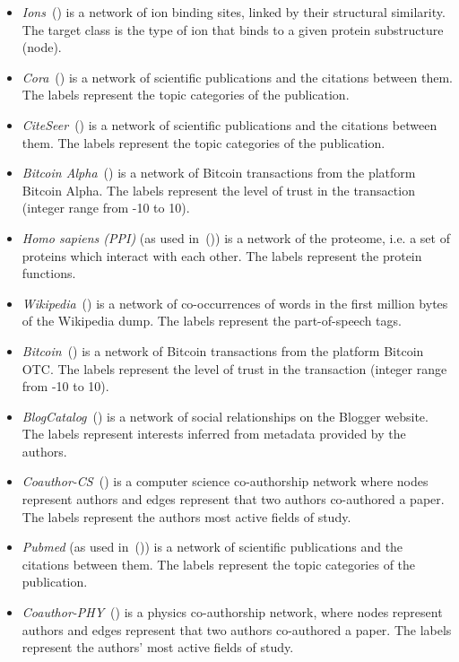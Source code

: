 \documentclass[twoside,11pt]{article}
\begin{document}
\begin{itemize}
\item \emph{Ions}~(\cite{skrlj2019deep,minfskrlj}) is a network of ion binding sites, linked by their structural similarity. The target class is the type of ion that binds to a given protein substructure (node).
\item \emph{Cora}~(\cite{Qing2003citeseer}) is a network of scientific publications and the citations between them. The labels represent the topic categories of the publication.
\item \emph{CiteSeer}~(\cite{Qing2003citeseer}) is a network of scientific publications and the citations between them. The labels represent the topic categories of the publication.
\item \emph{Bitcoin Alpha}~(\cite{skrlj2019deep}) is a network of Bitcoin transactions from the platform Bitcoin Alpha. The labels represent the level of trust in the transaction (integer range from -10 to 10).
\item \emph{Homo sapiens (PPI)} (as used in~(\cite{grover2016node2vec})) is a network of the proteome, i.e. a set of proteins which interact with each other. The labels represent the protein functions.
\item \emph{Wikipedia}~(\cite{mahoney2011large}) is a network of co-occurrences of words in the first million bytes of the Wikipedia dump. The labels represent the part-of-speech tags.
\item \emph{Bitcoin}~(\cite{skrlj2019deep}) is a network of Bitcoin transactions from the platform Bitcoin OTC. The labels represent the level of trust in the transaction (integer range from -10 to 10).
\item \emph{BlogCatalog}~(\cite{zafarani2009social}) is a network of social relationships on the Blogger website. The labels represent interests inferred from metadata provided by the authors. 
\item \emph{Coauthor-CS}~(\cite{oleks2018pitfalls}) is a computer science co-authorship network where nodes represent authors and edges represent that two authors co-authored a paper. The labels represent the authors most active fields of study.
\item \emph{Pubmed} (as used in~(\cite{wang2020unifying})) is a network of scientific publications and the citations between them. The labels represent the topic categories of the publication.
\item \emph{Coauthor-PHY}~(\cite{oleks2018pitfalls}) is a physics co-authorship network, where nodes represent authors and edges represent that two authors co-authored a paper. The labels represent the authors' most active fields of study.
\end{itemize}
\end{document}
